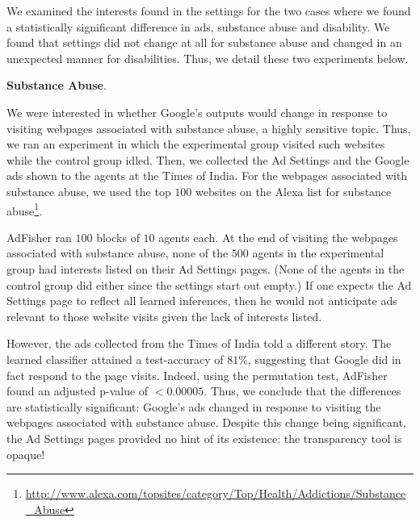\documentclass{article}
\makeatletter
\newcommand\gobblepars{\@ifnextchar\par {\expandafter\gobblepars\@gobble}{}}
\renewcommand{\paragraph}[1]{\smallskip\noindent\textbf{#1}.\ \ \gobblepars}
\newcommand{\ftnote}{\footnote}
\makeatother
\begin{document}
We examined the interests found in the settings for the two cases where we found a statistically significant difference in ads, substance abuse and disability.
We found that settings did not change at all for substance abuse and changed in an unexpected manner for disabilities.
Thus, we detail these two experiments below.


\paragraph{Substance Abuse}
We were interested in whether Google's outputs would change in response to visiting webpages associated with substance abuse, a highly sensitive topic.  Thus, we ran an experiment in which the experimental group visited such websites while the control group idled.  Then, we collected the Ad Settings and the Google ads shown to the agents at the Times of India.
For the webpages associated with substance abuse, we used the top $100$ websites on the Alexa list for substance abuse\ftnote{\url{http://www.alexa.com/topsites/category/Top/Health/Addictions/Substance_Abuse}}.

AdFisher ran $100$ blocks of $10$ agents each. 
At the end of visiting the webpages associated with substance abuse, none of the $500$ agents in the experimental group had interests listed on their Ad Settings pages.  (None of the agents in the control group did either since the settings start out empty.)
If one expects the Ad Settings page to reflect all learned inferences, then he would not anticipate ads relevant to those website visits given the lack of interests listed.


However, the ads collected from the Times of India told a different story.
The learned classifier attained a test-accuracy of $81\%$, suggesting that Google did in fact respond to the page visits.  
Indeed, using the permutation test, AdFisher found an adjusted p-value of $< 0.00005$. Thus, we conclude that the differences are statistically significant: Google's ads changed in response to visiting the webpages associated with substance abuse.
Despite this change being significant, the Ad Settings pages provided no hint of its existence: the transparency tool is opaque!
\end{document}
